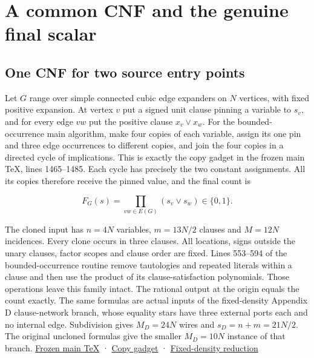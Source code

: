 \documentclass[
  11pt,
]{article}
\begin{document}
\section{A common CNF and the genuine final
scalar}\label{a-common-cnf-and-the-genuine-final-scalar}

\subsection{One CNF for two source entry
points}\label{one-cnf-for-two-source-entry-points}

Let \(G\) range over simple connected cubic edge expanders on \(N\)
vertices, with fixed positive expansion. At vertex \(v\) put a signed
unit clause pinning a variable to \(s_v\), and for every edge \(vw\) put
the positive clause \(x_v\lor x_w\). For the bounded-occurrence main
algorithm, make four copies of each variable, assign its one pin and
three edge occurrences to different copies, and join the four copies in
a directed cycle of implications. This is exactly the copy gadget in the
frozen main TeX, lines 1465--1485. Each cycle has precisely the two
constant assignments. All its copies therefore receive the pinned value,
and the final count is

\[
 F_G(s)=\prod_{vw\in E(G)}(s_v\lor s_w)\in\{0,1\}.
\]

The cloned input has \(n=4N\) variables, \(m=13N/2\) clauses and
\(M=12N\) incidences. Every clone occurs in three clauses. All
locations, signs outside the unary clauses, factor scopes and clause
order are fixed. Lines 553--594 of the bounded-occurrence routine remove
tautologies and repeated literals within a clause and then use the
product of its clause-satisfaction polynomials. Those operations leave
this family intact. The rational output at the origin equals the count
exactly. The same formulas are actual inputs of the fixed-density
Appendix D clause-network branch, whose equality stars have three
external ports each and no internal edge. Subdivision gives \(M_D=24N\)
wires and \(s_D=n+m=21N/2\). The original uncloned formulas give the
smaller \(M_D=10N\) instance of that branch.
\href{https://github.com/openai/math/blob/main/preprints/The-Exponential-Time-Hypothesis-is-False-October-25-2026/build/main_full_version.tex\#L553-L594}{Frozen
main TeX} ·
\href{https://github.com/openai/math/blob/main/preprints/The-Exponential-Time-Hypothesis-is-False-October-25-2026/build/main_full_version.tex\#L1465-L1485}{Copy
gadget} ·
\href{https://github.com/openai/math/blob/main/preprints/The-Exponential-Time-Hypothesis-is-False-October-25-2026/build/quantitative-reduction.tex\#L65-L97}{Fixed-density
reduction}
\end{document}
